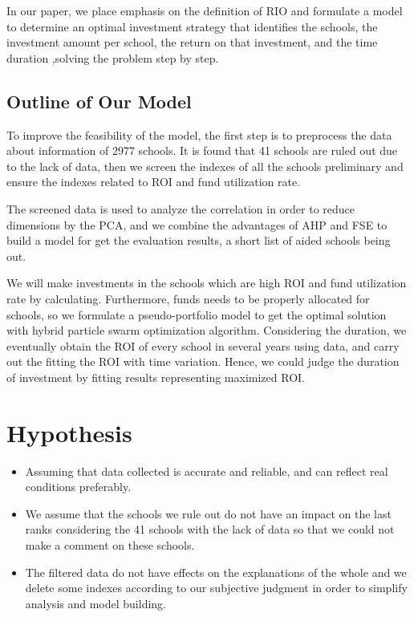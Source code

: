\documentclass{mcmthesis}
\begin{document}
In our paper, we place emphasis on the definition of RIO and formulate a model to determine an optimal investment strategy that identifies the schools, the investment amount per school, the return on that investment, and the time duration ,solving the problem step by step.\par


\subsection{Outline of Our Model}
To improve the feasibility of the model, the first step is to preprocess the data about information of 2977 schools. It is found that 41 schools are ruled out due to the lack of data, then we screen the indexes of all the schools preliminary and ensure the indexes related to ROI and fund utilization rate. \par

The screened data is used to analyze the correlation in order to reduce dimensions by the PCA, and we combine the advantages of AHP and FSE to build a model for get the evaluation results, a short list of aided schools being out.\par

We will make investments in the schools which are high ROI and fund utilization rate by calculating. Furthermore, funds needs to be properly allocated for schools, so we formulate a pseudo-portfolio model to get the optimal solution with hybrid particle swarm optimization algorithm. Considering the duration, we eventually obtain the ROI of every school in several years using data, and carry out the fitting the ROI with time variation. Hence, we could judge the duration of investment by fitting results representing maximized ROI.\par


\section{Hypothesis}
\begin{itemize}
    \item  Assuming that data collected is accurate and reliable, and can reflect real conditions preferably.
    \item We assume that the schools we rule out do not have an impact on the last ranks considering the 41 schools with the lack of data so that we could not make a comment on these schools. 
    \item The filtered data do not have effects on the explanations of the whole and we delete some indexes according to our subjective judgment in order to simplify analysis and model building. 
\end{itemize}\par
\end{document}
